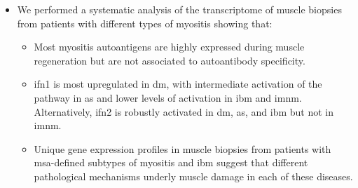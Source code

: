 \begin{itemize}
	\item We performed a systematic analysis of the transcriptome of muscle biopsies from patients with different types of myositis showing that:
	\begin{itemize}
		\item Most myositis autoantigens are highly expressed during muscle regeneration but are not associated to autoantibody specificity.
		
		\item \gls{ifn}1 is most upregulated in \gls{dm}, with intermediate activation of the pathway in \gls{as} and lower levels of activation in \gls{ibm} and \gls{imnm}. Alternatively, \gls{ifn}2 is robustly activated in \gls{dm}, \gls{as}, and \gls{ibm} but not in \gls{imnm}.
		
		\item Unique gene expression profiles in muscle biopsies from patients with \gls{msa}-defined subtypes of myositis and \gls{ibm} suggest that different pathological mechanisms underly muscle damage in each of these diseases.
	\end{itemize}
\end{itemize}
